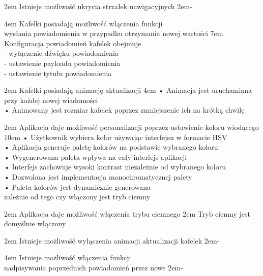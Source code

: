 {2em}{
    Istnieje możliwość ukrycia strzałek nawigacyjnych
}
{2em}{-}

{4em}{
    Kafelki posiadają możliwość włączenia funkcji\\
    wysłania powiadomienia w przypadku otrzymania nowej wartości
}
{7em}{
    Konfiguracja powiadomień kafelek obejmuje\\
    - wyłączenie dźwięku powiadomienia\\
    - ustawienie payloadu powiadomienia\\
    - ustawienie tytułu powiadomienia
}

{2em}{
    Kafelki posiadają animację aktualizacji
}
{4em}{
    • Animacja jest uruchamiana przy każdej nowej wiadomości\\
    • Animowany jest rozmiar kafelek poprzez zmniejszenie ich na krótką chwilę
}

{2em}{
    Aplikacja daje możliwość personalizacji poprzez ustawienie koloru wiodącego
}
{10em}{
    • Użytkownik wybiera kolor używając interfejsu w formacie HSV\\
    • Aplikacja generuje paletę kolorów na podstawie wybranego koloru\\
    • Wygenerowana paleta wpływa na cały interfejs aplikacji\\
    • Interfejs zachowuje wysoki kontrast niezależnie od wybranego koloru\\
    • Dozwolona jest implementacja monochromatycznej palety\\
    • Paleta kolorów jest dynamicznie generowana\\
    \hspace*{0.5em} zależnie od tego czy włączony jest tryb ciemny
}

{2em}{
    Aplikacja daje możliwość włączenia trybu ciemnego
}
{2em}{
    Tryb ciemny jest domyślnie włączony
}

{2em}{
    Istnieje możliwość wyłączenia animacji aktualizacji kafelek
}
{2em}{-}

{4em}{
    Istnieje możliwość włączenia funkcji\\
    nadpisywania poprzednich powiadomień przez nowe
}
{2em}{-}

